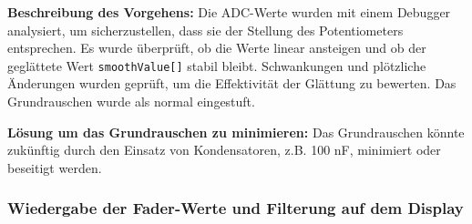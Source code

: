 \textbf{Beschreibung des Vorgehens:}
Die ADC-Werte wurden mit einem Debugger analysiert, um sicherzustellen, dass sie der Stellung des Potentiometers entsprechen. Es wurde überprüft, ob die Werte linear ansteigen und ob der geglättete Wert \texttt{smoothValue[]} stabil bleibt. Schwankungen und plötzliche Änderungen wurden geprüft, um die Effektivität der Glättung zu bewerten. Das Grundrauschen wurde als normal eingestuft.

\textbf{Lösung um das Grundrauschen zu minimieren:}
Das Grundrauschen könnte zukünftig durch den Einsatz von Kondensatoren, z.B. 100 nF, minimiert oder beseitigt werden.

\newpage
\subsubsection{Wiedergabe der Fader-Werte und Filterung auf dem Display}

